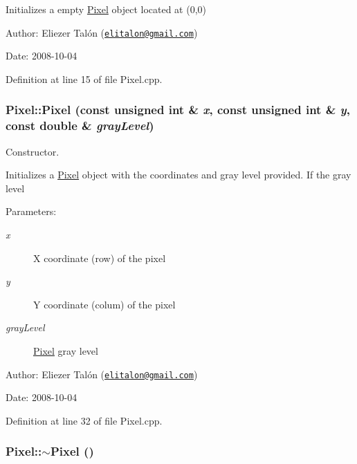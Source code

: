 Initializes a empty \hyperlink{class_pixel}{Pixel} object located at (0,0)

\begin{Desc}
\item[Author:]Eliezer Talón (\href{mailto:elitalon@gmail.com}{\tt elitalon@gmail.com}) \end{Desc}
\begin{Desc}
\item[Date:]2008-10-04 \end{Desc}


Definition at line 15 of file Pixel.cpp.\hypertarget{class_pixel_e54d95bf19847e4857eeb03f1138ceb9}{
\subsubsection[Pixel]{\setlength{\rightskip}{0pt plus 5cm}Pixel::Pixel (const unsigned int \& {\em x}, \/  const unsigned int \& {\em y}, \/  const double \& {\em grayLevel})}}
\label{class_pixel_e54d95bf19847e4857eeb03f1138ceb9}


Constructor. 

Initializes a \hyperlink{class_pixel}{Pixel} object with the coordinates and gray level provided. If the gray level

\begin{Desc}
\item[Parameters:]
\begin{description}
\item[{\em x}]X coordinate (row) of the pixel \item[{\em y}]Y coordinate (colum) of the pixel \item[{\em grayLevel}]\hyperlink{class_pixel}{Pixel} gray level\end{description}
\end{Desc}
\begin{Desc}
\item[Author:]Eliezer Talón (\href{mailto:elitalon@gmail.com}{\tt elitalon@gmail.com}) \end{Desc}
\begin{Desc}
\item[Date:]2008-10-04 \end{Desc}


Definition at line 32 of file Pixel.cpp.\hypertarget{class_pixel_30f6aaf9a1d8792245070860546fa365}{
\subsubsection[$\sim$Pixel]{\setlength{\rightskip}{0pt plus 5cm}Pixel::$\sim$Pixel ()}}
\label{class_pixel_30f6aaf9a1d8792245070860546fa365}


